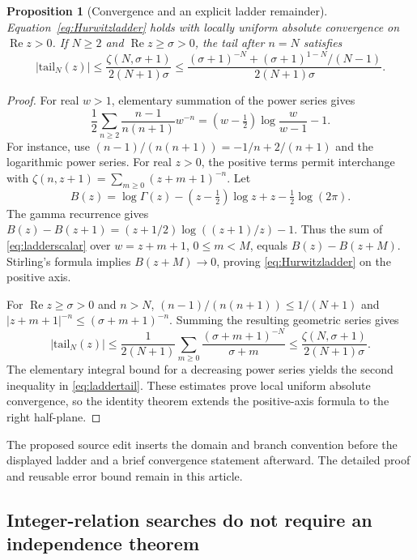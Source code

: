 \documentclass[11pt]{article}
\numberwithin{equation}{section}
\newtheorem{proposition}[theorem]{Proposition}
\theoremstyle{definition}\newtheorem{definition}[theorem]{Definition}
\theoremstyle{remark}\newtheorem{remark}[theorem]{Remark}
\DeclareMathOperator{\Rea}{Re}
\begin{document}
\begin{proposition}[Convergence and an explicit ladder remainder]
\label{prop:ladder}
Equation~\eqref{eq:Hurwitzladder} holds with locally uniform absolute
convergence on $\Rea z>0$. If $N\ge2$ and $\Rea z\ge\sigma>0$, the
tail after $n=N$ satisfies
\begin{equation}\label{eq:laddertail}
 |\mathrm{tail}_N(z)|
 \le\frac{\zeta(N,\sigma+1)}{2(N+1)\sigma}
 \le\frac{(\sigma+1)^{-N}+(\sigma+1)^{1-N}/(N-1)}{2(N+1)\sigma}.
\end{equation}
\end{proposition}
\begin{proof}
For real $w>1$, elementary summation of the power series gives
\begin{equation}\label{eq:ladderscalar}
 \frac12\sum_{n\ge2}\frac{n-1}{n(n+1)}w^{-n}
                =(w-\tfrac12)\log\frac{w}{w-1}-1.
\end{equation}
For instance, use
$(n-1)/(n(n+1))=-1/n+2/(n+1)$ and the logarithmic power series.
For real $z>0$, the positive terms permit interchange with
$\zeta(n,z+1)=\sum_{m\ge0}(z+m+1)^{-n}$.
Let
\[
 B(z)=\log\Gamma(z)-(z-\tfrac12)\log z+z-\tfrac12\log(2\pi).
\]
The gamma recurrence gives
$B(z)-B(z+1)=(z+1/2)\log((z+1)/z)-1$.
Thus the sum of \eqref{eq:ladderscalar} over $w=z+m+1$,
$0\le m<M$, equals $B(z)-B(z+M)$. Stirling's formula implies
$B(z+M)\to0$, proving \eqref{eq:Hurwitzladder} on the positive axis.

For $\Rea z\ge\sigma>0$ and $n>N$,
$(n-1)/(n(n+1))\le1/(N+1)$ and
$|z+m+1|^{-n}\le(\sigma+m+1)^{-n}$. Summing the resulting geometric
series gives
\[
 |\mathrm{tail}_N(z)|\le\frac1{2(N+1)}
      \sum_{m\ge0}\frac{(\sigma+m+1)^{-N}}{\sigma+m}
 \le\frac{\zeta(N,\sigma+1)}{2(N+1)\sigma}.
\]
The elementary integral bound for a decreasing power series yields the
second inequality in \eqref{eq:laddertail}. These estimates prove local
uniform absolute convergence, so the identity theorem extends the
positive-axis formula to the right half-plane.
\end{proof}

The proposed source edit inserts the domain and branch convention before
the displayed ladder and a brief convergence statement afterward.
The detailed proof and reusable error bound remain in this article.

\subsection{Integer-relation searches do not require an independence theorem}
\end{document}
